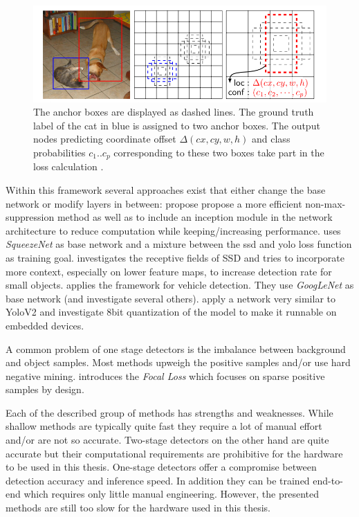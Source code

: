 	\begin{figure}[hbtp]
		
		\centering
		\captionsetup{justification=raggedright,singlelinecheck=false}
		\includegraphics[width=0.8\linewidth]{fig/anchors}
		\caption{The anchor boxes are displayed as dashed lines. The ground truth label of the cat in blue is assigned to two anchor boxes. The output nodes predicting coordinate offset $\Delta(cx, cy, w,h)$ and class probabilities $c_1 .. c_p$ corresponding to these two boxes take part in the loss calculation \cite{Liu}.}
		\label{fig:anchors}
		
	\end{figure}
	
	Within this framework several approaches exist that either change the base network or modify layers in between: \cite{ChengchengNing2017} propose propose a more efficient non-max-suppression method as well as to include an inception module in the network architecture to reduce computation while keeping/increasing performance. \cite{Wu} uses \textit{SqueezeNet} as base network and a mixture between the ssd and yolo loss function as training goal. \cite{Xiang} investigates the receptive fields of SSD and tries to incorporate more context, especially on lower feature maps, to increase detection rate for small objects.\cite{Linb} applies the framework for vehicle detection. They use \textit{GoogLeNet} as base network (and investigate several others).\cite{TripathiSanDiego} apply a network very similar to YoloV2 and investigate 8bit quantization of the model to make it runnable on embedded devices.
	
	A common problem of one stage detectors is the imbalance between background and object samples. Most methods upweigh the positive samples and/or use hard negative mining. \cite{Lin} introduces the \textit{Focal Loss} which focuses on sparse positive samples by design.
	
	Each of the described group of methods has strengths and weaknesses. While shallow methods are typically quite fast they require a lot of manual effort and/or are not so accurate. Two-stage detectors on the other hand are quite accurate but their computational requirements are prohibitive for the hardware to be used in this thesis. One-stage detectors offer a compromise between detection accuracy and inference speed. In addition they can be trained end-to-end which requires only little manual engineering. However, the presented methods are still too slow for the hardware used in this thesis.



